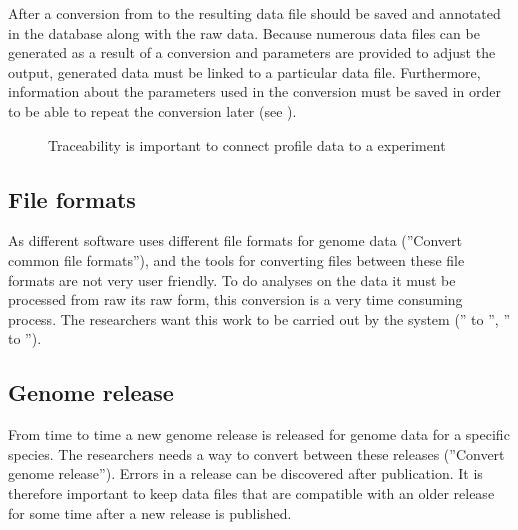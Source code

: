 After a conversion from  to  the resulting  data file should be saved and annotated in the database along with the raw data. Because numerous  data files can be generated as a result of a conversion and parameters are provided to adjust the output, generated  data must be linked to a particular  data file. Furthermore, information about the parameters used in the conversion must be saved in order to be able to repeat the conversion later (see ).

\begin{figure}[h]
\caption{Traceability is important to connect profile data to a experiment}
\label{fig:target_trace}
\end{figure}


\subsection{File formats}
As different software uses different file formats for genome data (''Convert common file formats''), and the tools for converting files between these file formats are not very user friendly. To do analyses on the data it must be processed from raw its raw form, this conversion is a very time consuming process. The researchers want this work to be carried out by the system ('' to '', '' to '').

\subsection{Genome release}
From time to time a new genome release is released for genome data for a specific species. The researchers needs a way to convert between these releases (''Convert genome release''). Errors in a release can be discovered after publication. It is therefore important to keep data files that are compatible with an older release for some time after a new release is published.  

